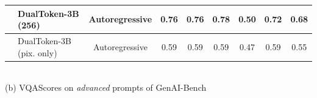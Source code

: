 \begin{table}[t!]
{\begin{NiceTabular}{clccccccc}
    \compare{}&\compare{}DualToken-3B (256) & \compare{}Autoregressive & \compare{}0.76 & \compare{}0.76 & \compare{}0.78 & \compare{}0.50 & \compare{}0.72 & \compare{}0.68 \\
    \midrule
    \baseline{}&\baseline{}DualToken-3B (pix. only) &\baseline{}Autoregressive & \baseline{}0.59 &\baseline{}0.59 &\baseline{}0.59 &\baseline{}0.47 & \baseline{}0.59 &\baseline{}0.55 \\
    \bottomrule
    \end{NiceTabular}} \\
    \vspace{1mm}
     (b) VQAScores on \textit{advanced} prompts of GenAI-Bench~\citep{GenAI-Bench}
    \vspace{-10pt}
\label{tab:main}
\end{table}
